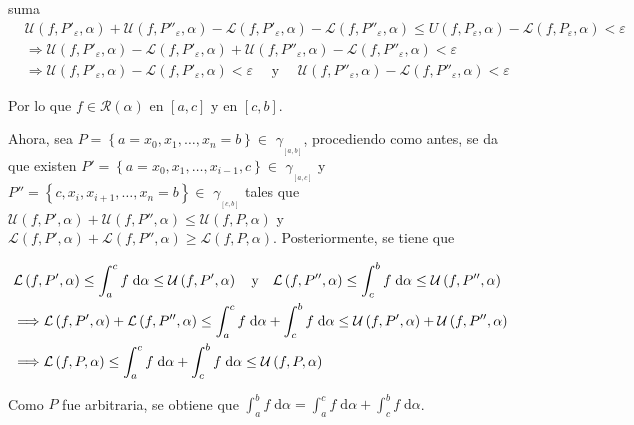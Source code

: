 \documentclass[12pt]{article}
\newenvironment{ejercicio}[1]{\begin{ejer}[breakable, pad at break = 5mm, leftrule = 0.7mm, rightrule = 0.7mm, right = 2mm, left = 2mm, enlarge bottom finally by = 3mm, fontlower = \setlength{\parskip}{2mm}]{}{#1}}{\end{ejer}}
\newcommand{\rsi}[1]{\mathcal{R}(#1)}
\begin{document}
\begin{ejercicio}{suma}
		\begin{align*}
			&\mathcal{U} \left( f, P'_\varepsilon, \alpha \right) + \mathcal{U} \left( f, P''_\varepsilon, \alpha \right) - \mathcal{L} \left( f, P'_\varepsilon, \alpha \right) - \mathcal{L} \left( f, P''_\varepsilon, \alpha \right) \leq U(f,P_\varepsilon,\alpha) -\mathcal{L} (f,P_\varepsilon,\alpha) < \varepsilon \\
			&\Longrightarrow \mathcal{U} \left( f, P'_\varepsilon, \alpha \right) - \mathcal{L} \left( f, P'_\varepsilon, \alpha \right) + \mathcal{U} \left( f, P''_\varepsilon, \alpha \right) - \mathcal{L} \left( f, P''_\varepsilon, \alpha \right) < \varepsilon \\
			&\Longrightarrow \mathcal{U} \left( f, P'_\varepsilon, \alpha \right) - \mathcal{L} \left( f, P'_\varepsilon, \alpha \right) < \varepsilon \quad \mbox{ y } \quad \mathcal{U} \left( f, P''_\varepsilon, \alpha \right) - \mathcal{L} \left( f, P''_\varepsilon, \alpha \right) < \varepsilon
		\end{align*}
		
		Por lo que $ f \in \rsi{\alpha} $ en $ [a,c] $ y en $ [c,b] $. 

		Ahora, sea $ P = \left\lbrace a = x_0, x_1, \ldots, x_n = b \right\rbrace \in $ {\large $ \gamma_{_{[a,b]}} $}, procediendo como antes, se da que existen $ P' = \left\lbrace a = x_0, x_1, \ldots, x_{i-1}, c \right\rbrace \in $ {\large $ \gamma_{_{[a,c]}} $} y $ P'' = \left\lbrace c, x_i, x_{i+1}, \ldots, x_n = b \right\rbrace \in $ {\large $ \gamma_{_{[c,b]}} $} tales que $ \mathcal{U} \left( f, P', \alpha \right) + \mathcal{U} \left( f, P'', \alpha \right) \leq \mathcal{U} \left( f, P, \alpha \right) $ y $ \mathcal{L} \left( f, P', \alpha \right) + \mathcal{L} \left( f, P'', \alpha \right) \geq \mathcal{L} \left( f, P, \alpha \right) $. Posteriormente, se tiene que

		\begin{align*}
			&\mathcal{L} \left( f, P', \alpha \right) \leq \int_{a}^{c} f \; \mathrm{d} \alpha \leq \mathcal{U} \left( f, P', \alpha \right) \quad \hbox{y} \quad \mathcal{L} \left( f, P'', \alpha \right) \leq \int_{c}^{b} f \; \mathrm{d} \alpha \leq \mathcal{U} \left( f, P'', \alpha \right) \\
			&\Longrightarrow \mathcal{L} \left( f, P', \alpha \right) + \mathcal{L} \left( f, P'', \alpha \right) \leq \int_{a}^{c} f \; \mathrm{d} \alpha + \int_{c}^{b} f \; \mathrm{d} \alpha \leq \mathcal{U} \left( f, P', \alpha \right) + \mathcal{U} \left( f, P'', \alpha \right) \\
			&\Longrightarrow \mathcal{L} \left( f, P, \alpha \right) \leq \int_{a}^{c} f \; \mathrm{d} \alpha + \int_{c}^{b} f \; \mathrm{d} \alpha \leq \mathcal{U} \left( f, P, \alpha \right)
		\end{align*}

		Como $ P $ fue arbitraria, se obtiene que $ \displaystyle \int_{a}^{b} f \; \mathrm{d} \alpha = \int_{a}^{c} f \; \mathrm{d} \alpha + \int_{c}^{b} f \; \mathrm{d} \alpha $.
	\end{ejercicio}
\end{document}
